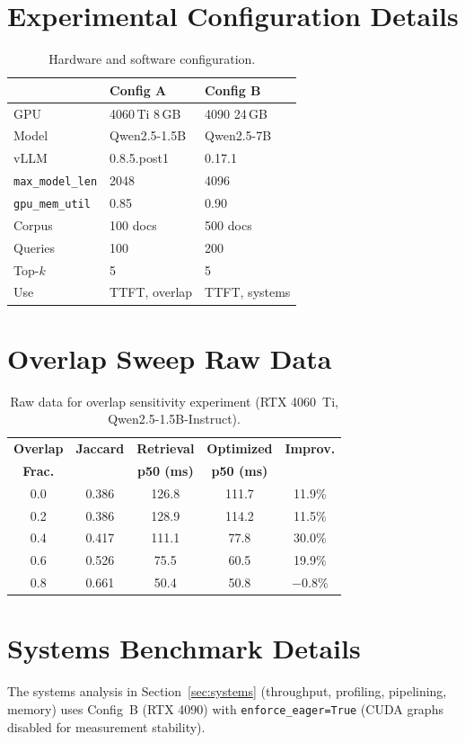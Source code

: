 \documentclass{article}
\begin{document}



\newpage
\appendix

\section{Experimental Configuration Details}
\label{app:config}

\begin{table}[h]
\caption{Hardware and software configuration.}
\centering
\small
\begin{tabular}{@{}lll@{}}
\toprule
 & \textbf{Config A} & \textbf{Config B} \\
\midrule
GPU & 4060\,Ti 8\,GB & 4090 24\,GB \\
Model & Qwen2.5-1.5B & Qwen2.5-7B \\
vLLM & 0.8.5.post1 & 0.17.1 \\
\texttt{max\_model\_len} & 2048 & 4096 \\
\texttt{gpu\_mem\_util} & 0.85 & 0.90 \\
Corpus & 100 docs & 500 docs \\
Queries & 100 & 200 \\
Top-$k$ & 5 & 5 \\
Use & TTFT, overlap & TTFT, systems \\
\bottomrule
\end{tabular}
\end{table}

\section{Overlap Sweep Raw Data}
\label{app:overlap}

\begin{table}[h]
\caption{Raw data for overlap sensitivity experiment (RTX 4060~Ti, Qwen2.5-1.5B-Instruct).}
\centering
\small
\begin{tabular}{@{}ccccc@{}}
\toprule
\textbf{Overlap} & \textbf{Jaccard} & \textbf{Retrieval} & \textbf{Optimized} & \textbf{Improv.} \\
\textbf{Frac.} & & \textbf{p50 (ms)} & \textbf{p50 (ms)} & \\
\midrule
0.0 & 0.386 & 126.8 & 111.7 & 11.9\% \\
0.2 & 0.386 & 128.9 & 114.2 & 11.5\% \\
0.4 & 0.417 & 111.1 & 77.8  & 30.0\% \\
0.6 & 0.526 & 75.5  & 60.5  & 19.9\% \\
0.8 & 0.661 & 50.4  & 50.8  & $-0.8$\% \\
\bottomrule
\end{tabular}
\end{table}

\section{Systems Benchmark Details}
\label{app:v100}

The systems analysis in Section~\ref{sec:systems} (throughput, profiling, pipelining, memory) uses Config~B (RTX 4090) with \texttt{enforce\_eager=True} (CUDA graphs disabled for measurement stability).
\end{document}
